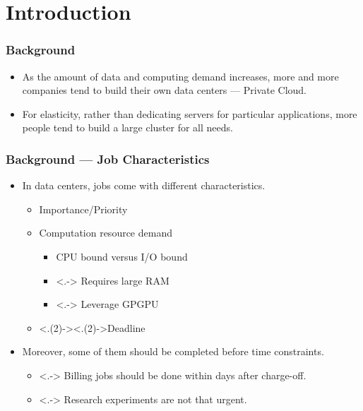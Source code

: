 \section{Introduction}

\begin{frame}
  \frametitle{Background}
  \begin{itemize}[<+->]
    \item As the amount of data and computing demand increases, more and
      more companies tend to build their own data centers --- Private
      Cloud.
    \item For elasticity, rather than dedicating servers for particular
      applications, more people tend to build a large cluster for all
      needs.
  \end{itemize}
\end{frame}
\begin{frame}
  \frametitle{Background --- Job Characteristics}
  \begin{itemize}[<+->]
    \item In data centers, jobs come with different characteristics.
      \begin{itemize}
        \item Importance/Priority
        \item Computation resource demand
          \begin{itemize}
            \item CPU bound versus I/O bound
            \item <.-> Requires large RAM
            \item <.-> Leverage GPGPU
          \end{itemize}
        \item <.(2)->{\alert<.(2)->{Deadline}}
      \end{itemize}
    \item Moreover, some of them should be completed before time
      constraints.
      \begin{itemize}
        \item <.-> Billing jobs should be done within days after
          charge-off.
        \item <.-> Research experiments are not that urgent.
      \end{itemize}
  \end{itemize}
\end{frame}

